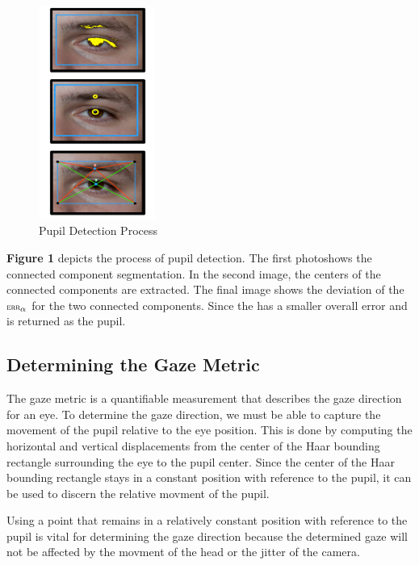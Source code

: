 \documentclass[annual]{acmsiggraph}
\newcommand{\Function}[1]{\ensuremath{{\small \textsc{#1}}}}
\begin{document}
\begin{figure}[ht]

    \centering

    \includegraphics[width=1.5in]{figs/pupilDetection.pdf}

    \caption{Pupil Detection Process}

\end{figure}

\textbf{Figure 1} depicts the process of pupil detection. The first photoshows
the connected component segmentation. In the second image, the centers of the
connected components are extracted. The final image shows the deviation of the
$\Function{err}_{\alpha}$ for the two connected components.  Since the has a
smaller overall error and is returned as the pupil.

\subsection{Determining the Gaze Metric}

The gaze metric is a quantifiable measurement that describes the gaze direction
for an eye. To determine the gaze direction, we must be able to capture the
movement of the pupil relative to the eye position. This is done by computing
the horizontal and vertical displacements from the center of the Haar bounding
rectangle surrounding the eye to the pupil center. Since the center of the Haar
bounding rectangle stays in a constant position with reference to the pupil, it
can be used to discern the relative movment of the pupil.

Using a point that remains in a relatively constant position with reference to
the pupil is vital for determining the gaze direction because the determined
gaze will not be affected by the movment of the head or the jitter of the
camera.
\end{document}
